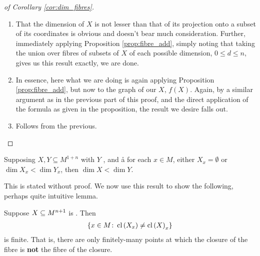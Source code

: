 \begin{proof}[of Corollary \ref{cor:dim_fibres}]
  \leavevmode
  \begin{enumerate}
    \item That the dimension of $X$ is not lesser than that of its projection onto a subset of its coordinates is obvious and doesn't bear much consideration. Further, immediately applying Proposition \ref{prop:fibre_add}, simply noting that taking the union over fibres of subsets of $X$ of each possible dimension, $0 \leq d \leq n$, gives us this result exactly, we are done.

    \item In essence, here what we are doing is again applying Proposition \ref{prop:fibre_add}, but now to the graph of our $X$, $f(X)$. Again, by a similar argument as in the previous part of this proof, and the direct application of the formula as given in the proposition, the result we desire falls out.

    \item Follows from the previous.
    \end{enumerate}
\end{proof}



\begin{proposition}
  \label{prop:dim_exc}
  Supposing $X, Y \subseteq M^{1 + n}$ with $Y$ \inhb, and å for each $x \in M$, either $X_x = \emptyset$ or $\dim{X_x} < \dim{Y_x}$, then $\dim{X} < \dim{Y}$.
\end{proposition}
This is stated without proof.
We now use this result to show the following, perhaps quite intuitive lemma.
\begin{lemma}
  \label{lemma:closures_fibres}
  Suppose $X \subseteq M^{n+1}$ is . Then
  \begin{align*}
    \left\{ x \in M \colon \operatorname{cl}\left(X_x\right) \neq \operatorname{cl}\left(X\right)_x \right\}
  \end{align*}
  is finite. That is, there are only finitely-many points at which the closure of the fibre is \textbf{not} the fibre of the closure.
\end{lemma}

